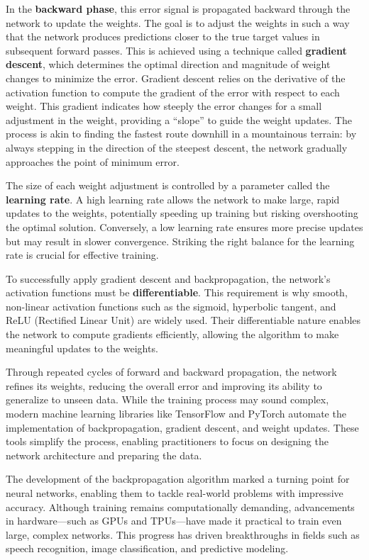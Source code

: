 \documentclass[
]{book}
\theoremstyle{definition}
\theoremstyle{definition}
\theoremstyle{definition}
\theoremstyle{definition}
\theoremstyle{remark}
\begin{document}
In the \textbf{backward phase}, this error signal is propagated backward through the network to update the weights. The goal is to adjust the weights in such a way that the network produces predictions closer to the true target values in subsequent forward passes. This is achieved using a technique called \textbf{gradient descent}, which determines the optimal direction and magnitude of weight changes to minimize the error. Gradient descent relies on the derivative of the activation function to compute the gradient of the error with respect to each weight. This gradient indicates how steeply the error changes for a small adjustment in the weight, providing a ``slope'' to guide the weight updates. The process is akin to finding the fastest route downhill in a mountainous terrain: by always stepping in the direction of the steepest descent, the network gradually approaches the point of minimum error.

The size of each weight adjustment is controlled by a parameter called the \textbf{learning rate}. A high learning rate allows the network to make large, rapid updates to the weights, potentially speeding up training but risking overshooting the optimal solution. Conversely, a low learning rate ensures more precise updates but may result in slower convergence. Striking the right balance for the learning rate is crucial for effective training.

To successfully apply gradient descent and backpropagation, the network's activation functions must be \textbf{differentiable}. This requirement is why smooth, non-linear activation functions such as the sigmoid, hyperbolic tangent, and ReLU (Rectified Linear Unit) are widely used. Their differentiable nature enables the network to compute gradients efficiently, allowing the algorithm to make meaningful updates to the weights.

Through repeated cycles of forward and backward propagation, the network refines its weights, reducing the overall error and improving its ability to generalize to unseen data. While the training process may sound complex, modern machine learning libraries like TensorFlow and PyTorch automate the implementation of backpropagation, gradient descent, and weight updates. These tools simplify the process, enabling practitioners to focus on designing the network architecture and preparing the data.

The development of the backpropagation algorithm marked a turning point for neural networks, enabling them to tackle real-world problems with impressive accuracy. Although training remains computationally demanding, advancements in hardware---such as GPUs and TPUs---have made it practical to train even large, complex networks. This progress has driven breakthroughs in fields such as speech recognition, image classification, and predictive modeling.
\end{document}
